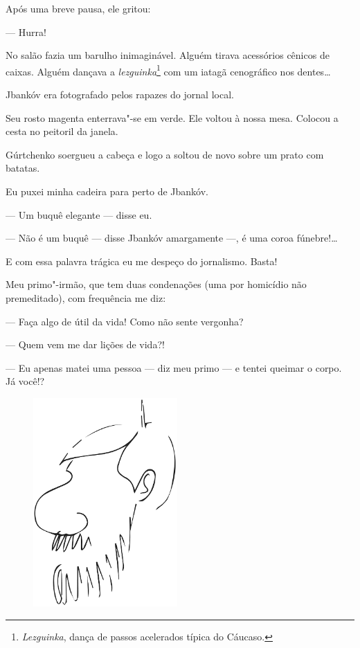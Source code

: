 Após uma breve pausa, ele gritou:

--- Hurra!

No salão fazia um barulho inimaginável. Alguém tirava acessórios cênicos
de caixas. Alguém dançava a \emph{lezguinka}\footnote{\emph{Lezguinka},
  dança de passos acelerados típica do Cáucaso.} com um iatagã
cenográfico nos dentes\ldots{}

Jbankóv era fotografado pelos rapazes do jornal local.

Seu rosto magenta enterrava"-se em verde. Ele voltou à nossa mesa. Colocou
a cesta no peitoril da janela.

Gúrtchenko soergueu a cabeça e logo a soltou de novo sobre um prato com
batatas.

Eu puxei minha cadeira para perto de Jbankóv.

--- Um buquê elegante --- disse eu.

--- Não é um buquê --- disse Jbankóv amargamente ---, é uma coroa
fúnebre!\ldots{}

E com essa palavra trágica eu me despeço do jornalismo. Basta!

Meu primo"-irmão, que tem duas condenações (uma por homicídio não
premeditado), com frequência me diz:

--- Faça algo de útil da vida! Como não sente vergonha?

--- Quem vem me dar lições de vida?!

--- Eu apenas matei uma pessoa --- diz meu primo --- e tentei queimar o
corpo. Já você!?


\clearpage
\thispagestyle{empty}


\movetoevenpage
\thispagestyle{empty}
\begin{vplace}[1]
\begin{figure}[!ht]
\centering
  \includegraphics[width=55mm]{./imgs/autocharge.jpg}
 \end{figure}
\end{vplace}

